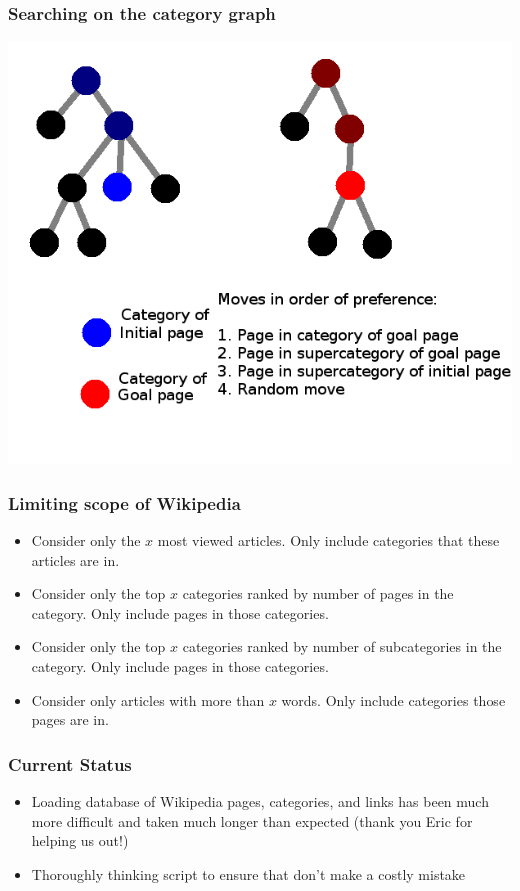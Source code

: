 \documentclass{beamer}
\begin{document}
\begin{frame}
\frametitle{Searching on the category graph}
  \includegraphics[height=0.8\textheight]{img/cats-4b.png}
\end{frame}

\begin{frame}
\frametitle{Limiting scope of Wikipedia}

\begin{itemize}
\item Consider only the $x$ most viewed articles. Only include categories that
  these articles are in.

\item Consider only the top $x$ categories ranked by number of pages in the
  category. Only include pages in those categories.

\item Consider only the top $x$ categories ranked by number of subcategories in the
  category. Only include pages in those categories.

\item Consider only articles with more than $x$ words. Only include categories
  those pages are in.
\end{itemize}

\end{frame}

\begin{frame}
  \frametitle{Current Status}
  \begin{itemize}
  \item Loading database of Wikipedia pages, categories, and links has been much
    more difficult and taken much longer than expected (thank you Eric for
    helping us out!)
    \item Thoroughly thinking script to ensure that don't make a costly mistake
  \end{itemize}

\end{frame}
\end{document}
